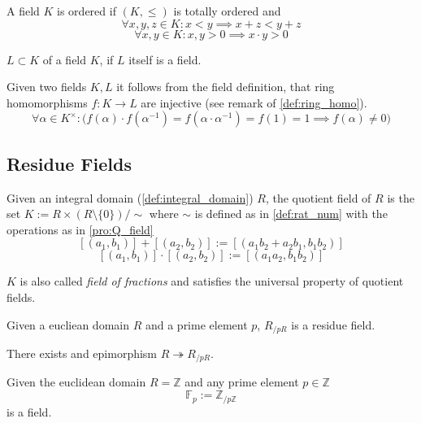 \begin{definition}
   A field \(K\) is ordered if \((K, \leq)\) is totally ordered and
   \[\forall x, y, z \in K: x < y \implies x + z < y + z\]
   \[\forall x, y \in K: x, y > 0 \implies x \cdot y > 0\]
\end{definition}

\begin{definition}[Subfield]
   \(L \subset K\) of a field \(K\), if \(L\) itself is a field.
\end{definition}

Given two fields \(K, L\) it follows from the field definition, that ring homomorphisms \(f: K \to L\) are injective (see remark of \cref{def:ring_homo}).
\[\forall \alpha \in K^\times: \big(f(\alpha) \cdot f(\alpha^{-1}) = f(\alpha \cdot \alpha^{-1}) = f(1) = 1 \implies f(\alpha) \neq 0\big)\]

\subsection{Residue Fields}
\begin{definition}
   Given an integral domain (\ref{def:integral_domain}) \(R\), the quotient field of \(R\) is the set \(K := R \times (R \setminus \{0\})/\sim\) where \(\sim\) is defined as in \cref{def:rat_num}
   with the operations as in \cref{pro:Q_field}
   \[[(a_1, b_1)] + [(a_2, b_2)] := [(a_1b_2 + a_2b_1, b_1b_2)]\]
   \[[(a_1, b_1)] \cdot [(a_2, b_2)] := [(a_1a_2, b_1b_2)]\]
\end{definition}
\begin{remark}
   \(K\) is also called \emph{field of fractions} and satisfies the universal property of quotient fields.
\end{remark}

\begin{definition}
   Given a eucliean domain \(R\) and a prime element \(p\), \(R_{/pR}\) is a residue field.
\end{definition}
\begin{remark}
   There exists and epimorphism \(R \twoheadrightarrow R_{/pR}\).
\end{remark}

\begin{definition}
   Given the euclidean domain \(R = \mathbb{Z}\) and any prime element \(p \in \mathbb{Z}\)
   \[\mathbb{F}_p := \mathbb{Z}_{/p\mathbb{Z}}\]
   is a field.
\end{definition}

